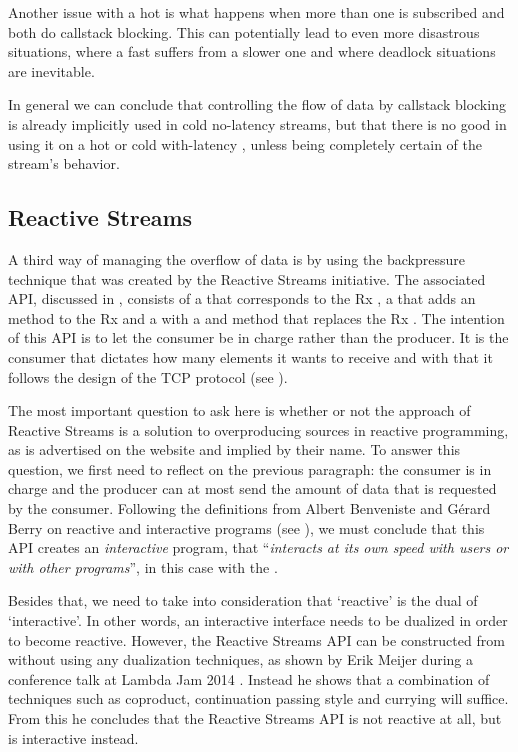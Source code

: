 Another issue with a hot \obs is what happens when more than one \obv is subscribed and both do callstack blocking. This can potentially lead to even more disastrous situations, where a fast \obv suffers from a slower one and where deadlock situations are inevitable.

In general we can conclude that controlling the flow of data by callstack blocking is already implicitly used in cold no-latency streams, but that there is no good in using it on a hot or cold with-latency \obs, unless being completely certain of the stream's behavior.

\subsection{Reactive Streams}
\label{subsec:handling-overproduction-with-reactive-streams}
A third way of managing the overflow of data is by using the backpressure technique that was created by the Reactive Streams initiative. The associated API, discussed in , consists of a  that corresponds to the Rx \obs, a  that adds an  method to the Rx \obv and a  with a  and  method that replaces the Rx \subs. The intention of this API is to let the consumer be in charge rather than the producer. It is the consumer that dictates how many elements it wants to receive and with that it follows the design of the TCP protocol (see ).

The most important question to ask here is whether or not the approach of Reactive Streams is a solution to overproducing sources in reactive programming, as is advertised on the website \cite{Reactive-Streams} and implied by their name. To answer this question, we first need to reflect on the previous paragraph: the consumer is in charge and the producer can at most send the amount of data that is requested by the consumer. Following the definitions from Albert Benveniste and G\'erard Berry \cite{berry1991-Reactive} on reactive and interactive programs (see ), we must conclude that this API creates an \emph{interactive} program, that ``\textit{interacts at its own speed with users or with other programs}'', in this case with the .

Besides that, we need to take into consideration that `reactive' is the dual of `interactive'. In other words, an interactive interface needs to be dualized in order to become reactive. However, the Reactive Streams API can be constructed from \ieb without using any dualization techniques, as shown by Erik Meijer during a conference talk at Lambda Jam 2014 \cite{meijer2014-Derivation}. Instead he shows that a combination of techniques such as coproduct, continuation passing style and currying will suffice. From this he concludes that the Reactive Streams API is not reactive at all, but is interactive instead.

